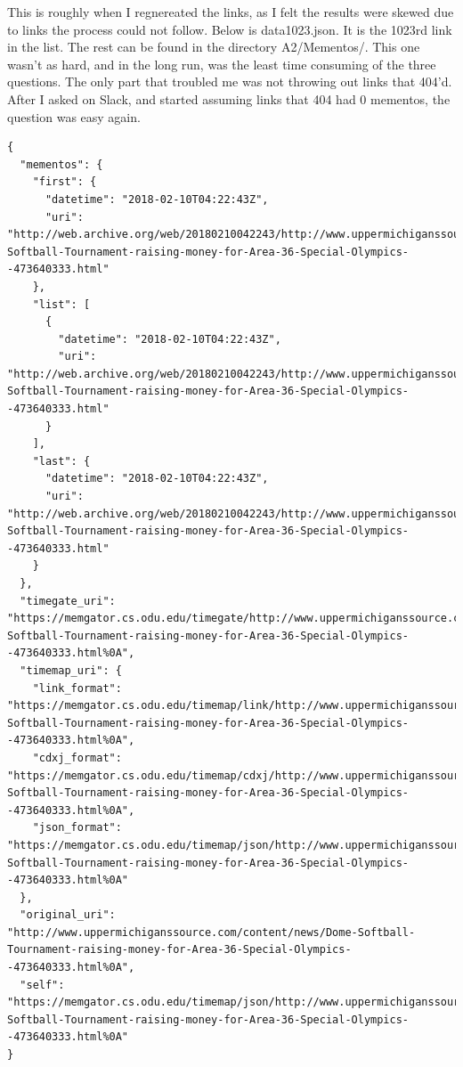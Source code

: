 \documentclass{article}
\begin{document}
This is roughly when I regnereated the links, as I felt the results were skewed due to links the process could not follow. Below is data1023.json. It is the 1023rd link in the list. The rest can be found in the directory A2/Mementos/. This one wasn't as hard, and in the long run, was the least time consuming of the three questions. The only part that troubled me was not throwing out links that 404'd. After I asked on Slack, and started assuming links that 404 had 0 mementos, the question was easy again.
\begin{lstlisting}
{
  "mementos": {
    "first": {
      "datetime": "2018-02-10T04:22:43Z",
      "uri": "http://web.archive.org/web/20180210042243/http://www.uppermichiganssource.com/content/news/Dome-Softball-Tournament-raising-money-for-Area-36-Special-Olympics--473640333.html"
    },
    "list": [
      {
        "datetime": "2018-02-10T04:22:43Z",
        "uri": "http://web.archive.org/web/20180210042243/http://www.uppermichiganssource.com/content/news/Dome-Softball-Tournament-raising-money-for-Area-36-Special-Olympics--473640333.html"
      }
    ],
    "last": {
      "datetime": "2018-02-10T04:22:43Z",
      "uri": "http://web.archive.org/web/20180210042243/http://www.uppermichiganssource.com/content/news/Dome-Softball-Tournament-raising-money-for-Area-36-Special-Olympics--473640333.html"
    }
  },
  "timegate_uri": "https://memgator.cs.odu.edu/timegate/http://www.uppermichiganssource.com/content/news/Dome-Softball-Tournament-raising-money-for-Area-36-Special-Olympics--473640333.html%0A",
  "timemap_uri": {
    "link_format": "https://memgator.cs.odu.edu/timemap/link/http://www.uppermichiganssource.com/content/news/Dome-Softball-Tournament-raising-money-for-Area-36-Special-Olympics--473640333.html%0A",
    "cdxj_format": "https://memgator.cs.odu.edu/timemap/cdxj/http://www.uppermichiganssource.com/content/news/Dome-Softball-Tournament-raising-money-for-Area-36-Special-Olympics--473640333.html%0A",
    "json_format": "https://memgator.cs.odu.edu/timemap/json/http://www.uppermichiganssource.com/content/news/Dome-Softball-Tournament-raising-money-for-Area-36-Special-Olympics--473640333.html%0A"
  },
  "original_uri": "http://www.uppermichiganssource.com/content/news/Dome-Softball-Tournament-raising-money-for-Area-36-Special-Olympics--473640333.html%0A",
  "self": "https://memgator.cs.odu.edu/timemap/json/http://www.uppermichiganssource.com/content/news/Dome-Softball-Tournament-raising-money-for-Area-36-Special-Olympics--473640333.html%0A"
}
\end{lstlisting}
\pagebreak
\end{document}
